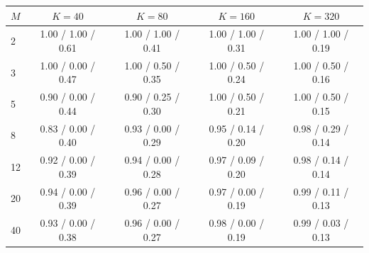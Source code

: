 \begin{tabular}{@{}lcccc@{}}\toprule
$M$ & $K=40$ & $K=80$ & $K=160$ & $K=320$ \\ \midrule
2 & 1.00 / 1.00 / 0.61 & 1.00 / 1.00 / 0.41 & 1.00 / 1.00 / 0.31 & 1.00 / 1.00 / 0.19 \\
3 & 1.00 / 0.00 / 0.47 & 1.00 / 0.50 / 0.35 & 1.00 / 0.50 / 0.24 & 1.00 / 0.50 / 0.16 \\
5 & 0.90 / 0.00 / 0.44 & 0.90 / 0.25 / 0.30 & 1.00 / 0.50 / 0.21 & 1.00 / 0.50 / 0.15 \\
8 & 0.83 / 0.00 / 0.40 & 0.93 / 0.00 / 0.29 & 0.95 / 0.14 / 0.20 & 0.98 / 0.29 / 0.14 \\
12 & 0.92 / 0.00 / 0.39 & 0.94 / 0.00 / 0.28 & 0.97 / 0.09 / 0.20 & 0.98 / 0.14 / 0.14 \\
20 & 0.94 / 0.00 / 0.39 & 0.96 / 0.00 / 0.27 & 0.97 / 0.00 / 0.19 & 0.99 / 0.11 / 0.13 \\
40 & 0.93 / 0.00 / 0.38 & 0.96 / 0.00 / 0.27 & 0.98 / 0.00 / 0.19 & 0.99 / 0.03 / 0.13 \\
\bottomrule\end{tabular}